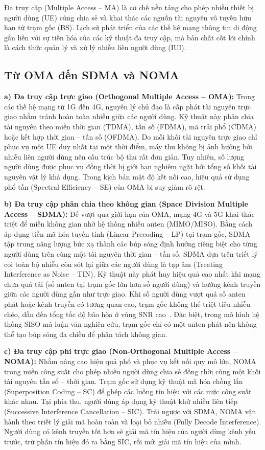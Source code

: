 Đa truy cập (Multiple Access -- MA) là cơ chế nền tảng cho phép nhiều thiết bị người dùng (UE) cùng chia
sẻ và khai thác các nguồn tài nguyên vô tuyến hữu hạn từ trạm gốc (BS). Lịch sử phát triển của các thế
hệ mạng thông tin di động gắn liền với sự tiến hóa của các kỹ thuật đa truy cập, mà bản chất cốt lõi
chính là cách thức quản lý và xử lý nhiễu liên người dùng (IUI).

\subsection{Từ OMA đến SDMA và NOMA}
\label{ssec:oma-sdma-noma}

\textbf{a) Đa truy cập trực giao (Orthogonal Multiple Access -- OMA):} Trong các thế hệ mạng từ 1G đến
4G, nguyên lý chủ đạo là cấp phát tài nguyên trực giao nhằm tránh hoàn toàn nhiễu giữa các người dùng.
Kỹ thuật này phân chia tài nguyên theo miền thời gian (TDMA), tần số (FDMA), mã trải phổ (CDMA) hoặc kết
hợp thời gian -- tần số (OFDMA). Do mỗi khối tài nguyên trực giao chỉ phục vụ một UE duy nhất tại một thời
điểm, máy thu không bị ảnh hưởng bởi nhiễu liên người dùng nên cấu trúc bộ thu rất đơn giản. Tuy nhiên,
số lượng người dùng được phục vụ đồng thời bị giới hạn nghiêm ngặt bởi tổng số khối tài nguyên vật lý khả
dụng. Trong kịch bản mật độ kết nối cao, hiệu quả sử dụng phổ tần (Spectral Efficiency -- SE) của OMA bị
suy giảm rõ rệt.

\textbf{b) Đa truy cập phân chia theo không gian (Space Division Multiple Access -- SDMA):} Để vượt qua
giới hạn của OMA, mạng 4G và 5G khai thác triệt để miền không gian nhờ hệ thống nhiều anten (MIMO/MISO).
Bằng cách áp dụng tiền mã hóa tuyến tính (Linear Precoding -- LP) tại trạm gốc, SDMA tập trung năng lượng
bức xạ thành các búp sóng định hướng riêng biệt cho từng người dùng trên cùng một tài nguyên thời gian --
tần số. SDMA dựa trên triết lý coi toàn bộ nhiễu còn sót lại giữa các người dùng là tạp âm (Treating
Interference as Noise -- TIN). Kỹ thuật này phát huy hiệu quả cao nhất khi mạng chưa quá tải (số anten
tại trạm gốc lớn hơn số người dùng) và hướng kênh truyền giữa các người dùng gần như trực giao. Khi số
người dùng vượt quá số anten phát hoặc kênh truyền có tương quan cao, trạm gốc không thể triệt tiêu nhiễu
chéo, dẫn đến tổng tốc độ bão hòa ở vùng SNR cao~\cite{Mao2018RSMABridging}. Đặc biệt, trong mô hình hệ
thống SISO mà luận văn nghiên cứu, trạm gốc chỉ có một anten phát nên không thể tạo búp sóng đa chiều để
phân tách không gian.

\textbf{c) Đa truy cập phi trực giao (Non-Orthogonal Multiple Access -- NOMA):} Nhằm nâng cao hiệu quả phổ
và phục vụ kết nối quy mô lớn, NOMA trong miền công suất cho phép nhiều người dùng chia sẻ đồng thời cùng
một khối tài nguyên tần số -- thời gian. Trạm gốc sử dụng kỹ thuật mã hóa chồng lấn (Superposition Coding
-- SC) để ghép các luồng tín hiệu với các mức công suất khác nhau. Tại phía thu, người dùng áp dụng kỹ
thuật khử nhiễu liên tiếp (Successive Interference Cancellation -- SIC). Trái ngược với SDMA, NOMA vận
hành theo triết lý giải mã hoàn toàn và loại bỏ nhiễu (Fully Decode Interference). Người dùng có kênh
truyền tốt hơn sẽ giải mã tín hiệu của người dùng kênh yếu trước, trừ phần tín hiệu đó ra bằng SIC, rồi
mới giải mã tín hiệu của mình.

